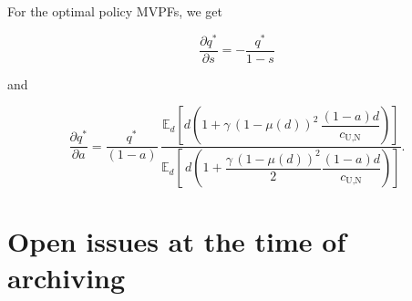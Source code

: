 \documentclass[12pt]{article}
\begin{document}
For the optimal policy MVPFs, we get 

\begin{equation}
\frac{\partial q^*}{\partial s}=-\frac{q^*}{1-s} 
\end{equation}

and

\begin{equation}
\frac{\partial q^*}{\partial a}=\dfrac{q^*}{(1-a)}\,\frac{\mathbb{E}_d\!\left[d\left(1+\gamma\,(1-\mu(d))^2\,\dfrac{(1-a)d}{c_{\text{U,N}}}\right)\right]}{\mathbb{E}_d\!\left[\,d\left(1+\dfrac{\gamma\,(1-\mu(d))^2}{2}\dfrac{(1-a)d}{c_{\text{U,N}}}\right)\right]}.
\end{equation}


\section{Open issues at the time of archiving}
\label{sec:open}
\end{document}
